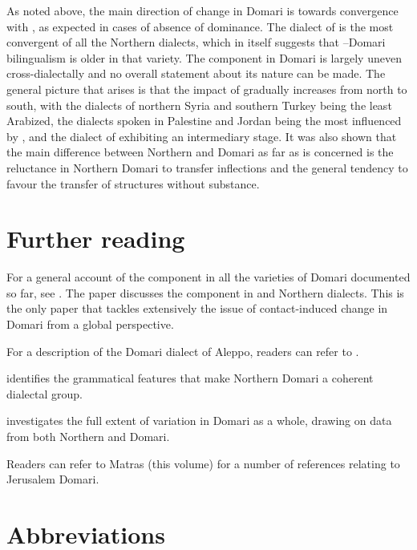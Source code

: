 \documentclass[output=paper]{langsci/langscibook}
\begin{document}
As noted above, the main direction of change in Domari is towards {convergence} with , as expected in cases of absence of dominance. The dialect of  is the most convergent of all the Northern dialects, which in itself suggests that --Domari {bilingualism} is older in that variety. The  component in Domari is largely uneven cross-dialectally and no overall statement about its nature can be made. The general picture that arises is that the impact of  gradually increases from north to south, with the dialects of northern Syria and southern Turkey being the least Arabized, the  dialects spoken in Palestine and Jordan being the most influenced by , and the dialect of  exhibiting an intermediary stage. It was also shown that the main difference between Northern and  Domari as far as  is concerned is the reluctance in Northern Domari to {transfer}  inflections and the general tendency to favour the {transfer} of structures without substance.

\section*{Further reading}
\begin{furtherreading}

\item[For a general account] of the  component in all the varieties of Domari documented so far, see \citet{Herin2018}. The paper discusses the  component in  and Northern dialects. This is the only paper that tackles extensively the issue of contact-induced change in Domari from a global perspective.
\item[For a description] of the Domari dialect of Aleppo, readers can refer to \citet{Herin2012}.
\item[\citet{Herin2014Domari}] identifies the grammatical features that make Northern Domari a coherent dialectal group.
\item[\citet{Herin2016}] investigates the full extent of variation in Domari as a whole, drawing on data from both Northern and  Domari.
\item[Readers can refer to Matras] (this volume) for a number of references relating to {Jerusalem Domari}.
\end{furtherreading}

\section*{Abbreviations}
\end{document}
